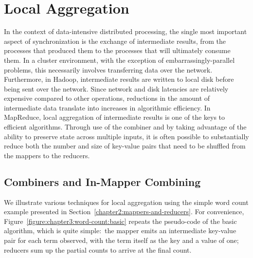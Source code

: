 \section{Local Aggregation}
\label{chapter3:local-aggregation}

In the context of data-intensive distributed processing, the single
most important aspect of synchronization is the exchange of
intermediate results, from the processes that produced them to the
processes that will ultimately consume them.  In a cluster
environment, with the exception of embarrassingly-parallel problems,
this necessarily involves transferring data over the network.
Furthermore, in Hadoop, intermediate results are written to local disk
before being sent over the network.  Since network and disk latencies
are relatively expensive compared to other operations, reductions in
the amount of intermediate data translate into increases in
algorithmic efficiency.  In MapReduce, local aggregation of
intermediate results is one of the keys to efficient algorithms.
Through use of the combiner and by taking advantage of the ability to
preserve state across multiple inputs, it is often possible to
substantially reduce both the number and size of key-value pairs that
need to be shuffled from the mappers to the reducers.

\subsection{Combiners and In-Mapper Combining}
\label{chapter3:local-aggregation:combiners}

We illustrate various techniques for local aggregation using the
simple word count example presented in
Section~\ref{chapter2:mappers-and-reducers}.  For convenience,
Figure~\ref{figure:chapter3:word-count:basic} repeats the pseudo-code
of the basic algorithm, which is quite simple:\ the mapper emits an
intermediate key-value pair for each term observed, with the term
itself as the key and a value of one; reducers sum up the partial
counts to arrive at the final count.

